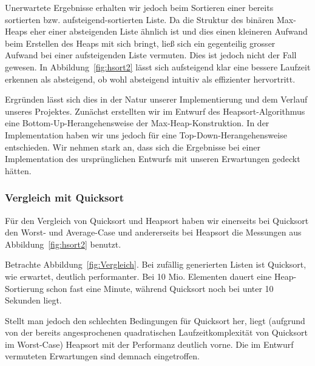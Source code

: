 Unerwartete Ergebnisse erhalten wir jedoch beim Sortieren einer bereits
sortierten bzw. aufsteigend-sortierten Liste.
Da die Struktur des binären Max-Heaps eher einer absteigenden Liste ähnlich
ist und dies einen kleineren Aufwand beim Erstellen des Heaps mit sich bringt,
ließ sich
ein gegenteilig grosser Aufwand bei einer aufsteigenden Liste vermuten.
Dies ist jedoch nicht der Fall gewesen.
In Abbildung~\ref{fig:hsort2} lässt sich aufsteigend klar eine bessere
Laufzeit erkennen als absteigend, ob wohl absteigend intuitiv als effizienter
hervortritt.

Ergründen lässt sich dies in der Natur unserer Implementierung und dem
Verlauf unseres Projektes.
Zunächst erstellten wir im Entwurf des Heapsort-Algorithmus eine
Bottom-Up-Herangehensweise der Max-Heap-Konstruktion.
In der Implementation haben wir uns jedoch für eine Top-Down-Herangehensweise
entschieden.
Wir nehmen stark an, dass sich die Ergebnisse bei einer Implementation des
ursprünglichen Entwurfs mit unseren Erwartungen gedeckt hätten.

\subsubsection{Vergleich mit Quicksort}\label{subsubsec:vergleich-mit-quicksort}

Für den Vergleich von Quicksort und Heapsort haben wir einerseits bei Quicksort
den Worst- und Average-Case und andererseits bei Heapsort die Messungen aus
Abbildung~\ref{fig:hsort2} benutzt.

Betrachte Abbildung~\ref{fig:Vergleich}.
Bei zufällig generierten Listen ist Quicksort, wie erwartet, deutlich
performanter.
Bei 10 Mio. Elementen dauert eine Heap-Sortierung schon fast eine Minute,
während Quicksort noch bei unter 10 Sekunden liegt.

Stellt man jedoch den schlechten Bedingungen für Quicksort her, liegt
(aufgrund von der bereits angesprochenen quadratischen Laufzeitkomplexität
von Quicksort im Worst-Case) Heapsort mit der Performanz deutlich vorne. Die
im Entwurf vermuteten Erwartungen sind demnach eingetroffen.



